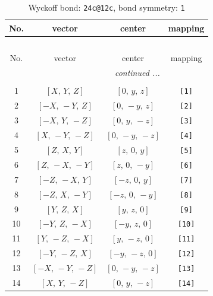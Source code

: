 \documentclass[fleqn,8pt]{jsarticle}
\begin{document}
\begin{longtable}{cccc}
\caption{Wyckoff bond: {\tt 24c@12c}, bond symmetry: {\tt 1}}
 \\
 \hline \hline
No. & vector & center & mapping \\ \hline \endfirsthead

\multicolumn{3}{l}{\tablename\ \thetable{}} \\
 \hline \hline
No. & vector & center & mapping \\ \hline \endhead

 \hline \hline
\multicolumn{3}{r}{\footnotesize\it continued ...} \\ \endfoot

 \hline \hline
\multicolumn{3}{r}{} \\ \endlastfoot

1 & $\left[ X,\, Y,\, Z \right]$ & $\left[ 0,\, y,\, z \right]$ & {\tt [1]} \\ \hline
2 & $\left[ - X,\, - Y,\, Z \right]$ & $\left[ 0,\, - y,\, z \right]$ & {\tt [2]} \\ \hline
3 & $\left[ - X,\, Y,\, - Z \right]$ & $\left[ 0,\, y,\, - z \right]$ & {\tt [3]} \\ \hline
4 & $\left[ X,\, - Y,\, - Z \right]$ & $\left[ 0,\, - y,\, - z \right]$ & {\tt [4]} \\ \hline
5 & $\left[ Z,\, X,\, Y \right]$ & $\left[ z,\, 0,\, y \right]$ & {\tt [5]} \\ \hline
6 & $\left[ Z,\, - X,\, - Y \right]$ & $\left[ z,\, 0,\, - y \right]$ & {\tt [6]} \\ \hline
7 & $\left[ - Z,\, - X,\, Y \right]$ & $\left[ - z,\, 0,\, y \right]$ & {\tt [7]} \\ \hline
8 & $\left[ - Z,\, X,\, - Y \right]$ & $\left[ - z,\, 0,\, - y \right]$ & {\tt [8]} \\ \hline
9 & $\left[ Y,\, Z,\, X \right]$ & $\left[ y,\, z,\, 0 \right]$ & {\tt [9]} \\ \hline
10 & $\left[ - Y,\, Z,\, - X \right]$ & $\left[ - y,\, z,\, 0 \right]$ & {\tt [10]} \\ \hline
11 & $\left[ Y,\, - Z,\, - X \right]$ & $\left[ y,\, - z,\, 0 \right]$ & {\tt [11]} \\ \hline
12 & $\left[ - Y,\, - Z,\, X \right]$ & $\left[ - y,\, - z,\, 0 \right]$ & {\tt [12]} \\ \hline
13 & $\left[ - X,\, - Y,\, - Z \right]$ & $\left[ 0,\, - y,\, - z \right]$ & {\tt [13]} \\ \hline
14 & $\left[ X,\, Y,\, - Z \right]$ & $\left[ 0,\, y,\, - z \right]$ & {\tt [14]} \\ \hline

\end{longtable}
\end{document}
